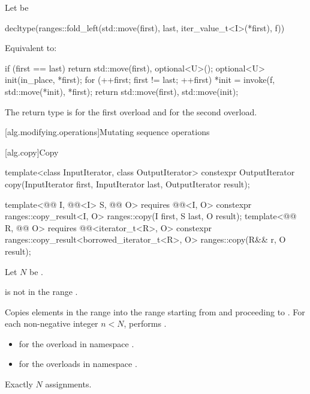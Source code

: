 \begin{itemdescr}
\pnum
Let  be
\begin{codeblock}
decltype(ranges::fold_left(std::move(first), last, iter_value_t<I>(*first), f))
\end{codeblock}

\pnum
\effects
Equivalent to:
\begin{codeblock}
if (first == last)
  return {std::move(first), optional<U>()};
optional<U> init(in_place, *first);
for (++first; first != last; ++first)
  *init = invoke(f, std::move(*init), *first);
return {std::move(first), std::move(init)};
\end{codeblock}

\pnum
\remarks
The return type is
for the first overload and
for the second overload.
\end{itemdescr}

[alg.modifying.operations]{Mutating sequence operations}

[alg.copy]{Copy}

%
\begin{itemdecl}
template<class InputIterator, class OutputIterator>
  constexpr OutputIterator copy(InputIterator first, InputIterator last,
                                OutputIterator result);

template<@@ I, @@<I> S, @@ O>
  requires @@<I, O>
  constexpr ranges::copy_result<I, O> ranges::copy(I first, S last, O result);
template<@@ R, @@ O>
  requires @@<iterator_t<R>, O>
  constexpr ranges::copy_result<borrowed_iterator_t<R>, O> ranges::copy(R&& r, O result);
\end{itemdecl}

\begin{itemdescr}
\pnum
Let $N$ be .

\pnum
\expects
{} is not in the range .

\pnum
\effects
Copies elements in the range 
into the range 
starting from  and proceeding to .
For each non-negative integer $n < N$,
performs .

\pnum
\returns
\begin{itemize}
\item
   for the overload in namespace .
\item
   for the overloads in namespace .
\end{itemize}

\pnum
\complexity
Exactly $N$ assignments.
\end{itemdescr}

